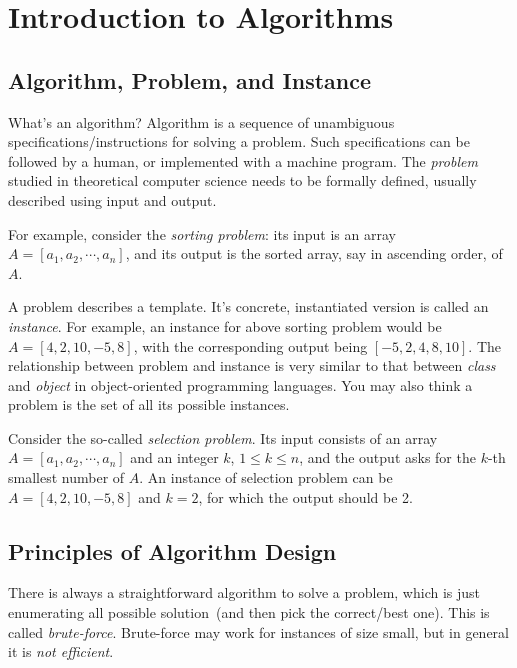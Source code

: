 \setcounter{definition}{0} \setcounter{property}{0} \setcounter{claim}{0} \setcounter{fact}{0} \setcounter{corollary}{0} \setcounter{figure}{0}
\section{Introduction to Algorithms}

\subsection*{Algorithm, Problem, and Instance}

What's an algorithm? Algorithm is a sequence of unambiguous specifications/instructions for solving a problem.
Such specifications can be followed by a human, or implemented with a machine program.
The \emph{problem} studied in theoretical computer science needs to be formally defined,
usually described using input and output.

For example, consider the \emph{sorting problem}: its input is an array $A =
[a_1, a_2, \cdots, a_n]$, and its output is the sorted array, say in ascending
order, of $A$.

A problem describes a template.  It's concrete, instantiated version is called
an \emph{instance}.  For example, an instance for above sorting problem would
be $A = [4, 2, 10, -5, 8]$, with the corresponding output being $[-5, 2, 4, 8, 10]$.
The relationship between problem and instance is
very similar to that between \emph{class} and \emph{object} in object-oriented
programming languages.  You may also think a problem is the set of all its
possible instances.

Consider the so-called \emph{selection problem}.
Its input consists of an array $A = [a_1, a_2, \cdots, a_n]$ and an integer $k$, $1\le k \le n$,
and the output asks for the $k$-th smallest number of $A$. An instance of selection problem
can be $A = [4, 2, 10, -5, 8]$ and $k = 2$, for which the output should be 2.

\subsection*{Principles of Algorithm Design}

There is always a straightforward algorithm to solve a problem, which is just enumerating all possible solution~(and then pick the correct/best one).
This is called \emph{brute-force}. Brute-force may work for instances of size small, but in general it is \emph{not efficient}.

